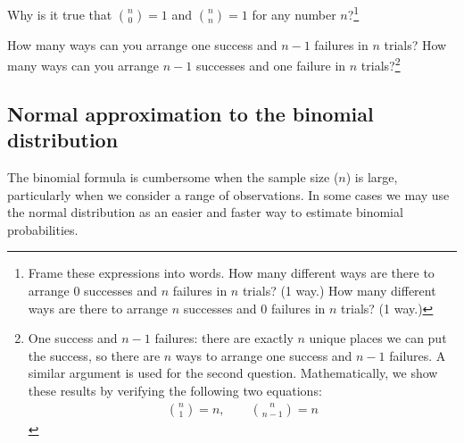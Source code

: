 \begin{exercise}
Why is it true that ${n \choose 0}=1$ and ${n \choose n}=1$ for any number $n$?\footnote{Frame these expressions into words. How many different ways are there to arrange 0 successes and $n$ failures in $n$ trials? (1 way.) How many different ways are there to arrange $n$ successes and 0 failures in $n$ trials? (1 way.)}
\end{exercise}

\begin{exercise}
How many ways can you arrange one success and $n-1$ failures in $n$ trials? How many ways can you arrange $n-1$ successes and one failure in $n$ trials?\footnote{One success and $n-1$ failures: there are exactly $n$ unique places we can put the success, so there are $n$ ways to arrange one success and $n-1$ failures. A similar argument is used for the second question. Mathematically, we show these results by verifying the following two equations:
\begin{eqnarray*}
{n \choose 1} = n, \qquad {n \choose n-1} = n
\end{eqnarray*}}
\end{exercise}



\subsection{Normal approximation to the binomial distribution}


The binomial formula is cumbersome when the sample size ($n$) is large, particularly when we consider a range of observations. In some cases we may use the normal distribution as an easier and faster way to estimate binomial probabilities.

